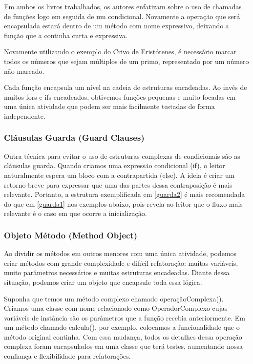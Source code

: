 Em ambos os livros trabalhados, os autores enfatizam sobre o uso de chamadas de funções logo em seguida de um condicional. Novamente a operação que será encapsulada estará dentro de um método com nome expressivo, deixando a função que a continha curta e expressiva.
	
Novamente utilizando o exemplo do Crivo de Eristótenes, é necessário marcar todos os números que sejam múltiplos de um primo, representado por um número não marcado.



Cada função encapsula um nível na cadeia de estruturas encadeadas. Ao invés de muitos fors e ifs encadeados, obtivemos funções pequenas e muito focadas em uma única atividade que podem ser mais facilmente testadas de forma independente.

\subsubsection{Cláusulas Guarda (Guard Clauses)}
Outra técnica para evitar o uso de estruturas complexas de condicionais são as cláusulas guarda. Quando criamos uma expressão condicional (if), o leitor naturalmente espera um bloco com a contrapartida (else). A ideia é criar um retorno breve para expressar que uma das partes dessa contraposição é mais relevante. Portanto, a estrutura exemplificada em \ref{guarda2} é mais recomendada do que em \ref{guarda1} nos exemplos abaixo, pois revela ao leitor que o fluxo mais relevante é o caso em que ocorre a inicialização.




\subsubsection{Objeto Método (Method Object)}
Ao dividir os métodos em outros menores com uma única atividade, podemos criar métodos com grande complexidade e difícil refatoração: muitas variáveis, muito parâmetros necessários e muitas estruturas encadeadas. Diante dessa situação, podemos criar um objeto que encapsule toda essa lógica. 
	
Suponha que temos um método complexo chamado operaçãoComplexa(). Criamos uma classe com nome relacionado como OperadorComplexo cujas variáveis de instância são os parâmetros que a função recebia anteriormente. Em um método chamado calcula(), por exemplo, colocamos a funcionalidade que o método original continha. Com essa mudança, todos os detalhes dessa operação complexa foram encapsulados em uma classe que terá testes, aumentando nossa confiança e flexibilidade para refatorações.
	
